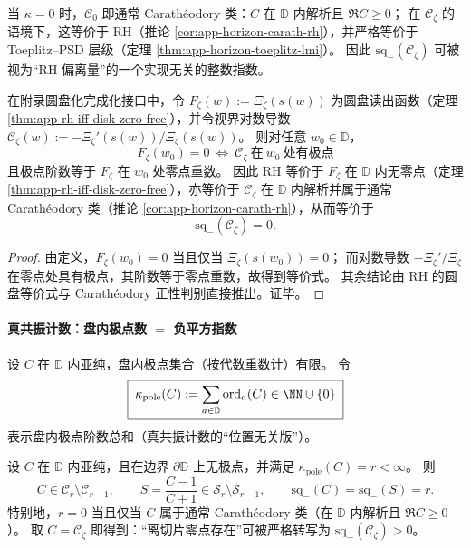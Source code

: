 \begin{remark}\label{rem:xi-negative-squares-vs-psd}
当 \(\kappa=0\) 时，\(\mathcal{C}_0\) 即通常 Carath\'eodory 类：\(C\) 在 \(\mathbb{D}\) 内解析且 \(\Re C\ge 0\)；
在 \(\mathscr{C}_{\zeta}\) 的语境下，这等价于 RH（推论 \ref{cor:app-horizon-carath-rh}），并严格等价于 Toeplitz--PSD 层级（定理 \ref{thm:app-horizon-toeplitz-lmi}）。
因此 \(\mathrm{sq}_-(\mathscr{C}_{\zeta})\) 可被视为“RH 偏离量”的一个实现无关的整数指数。
\end{remark}

\begin{theorem}\label{thm:xi-disk-zero-pole-index-reduction}
在附录圆盘化完成化接口中，令
\(
F_{\zeta}(w):=\Xi_{\zeta}(s(w))
\)
为圆盘读出函数（定理 \ref{thm:app-rh-iff-disk-zero-free}），并令视界对数导数
\(
\mathscr{C}_{\zeta}(w):=-\Xi_{\zeta}'(s(w))/\Xi_{\zeta}(s(w))
\)。
则对任意 \(w_0\in\mathbb{D}\)，
\[
\boxed{\;
F_{\zeta}(w_0)=0\ \Longleftrightarrow\ \mathscr{C}_{\zeta}\ \text{在}\ w_0\ \text{处有极点}\;}
\]
且极点阶数等于 \(F_{\zeta}\) 在 \(w_0\) 处零点重数。
因此 RH 等价于 \(F_{\zeta}\) 在 \(\mathbb{D}\) 内无零点（定理 \ref{thm:app-rh-iff-disk-zero-free}），亦等价于 \(\mathscr{C}_{\zeta}\) 在 \(\mathbb{D}\) 内解析并属于通常 Carath\'eodory 类（推论 \ref{cor:app-horizon-carath-rh}），从而等价于
\[
\boxed{\;\mathrm{sq}_-(\mathscr{C}_{\zeta})=0.\;}
\]
\end{theorem}

\begin{proof}
由定义，\(F_{\zeta}(w_0)=0\) 当且仅当 \(\Xi_{\zeta}(s(w_0))=0\)；
而对数导数 \(-\Xi_{\zeta}'/\Xi_{\zeta}\) 在零点处具有极点，其阶数等于零点重数，故得到等价式。
其余结论由 RH 的圆盘等价式与 Carath\'eodory 正性判别直接推出。证毕。
\end{proof}

\paragraph{真共振计数：盘内极点数 \texorpdfstring{$=$}{=} 负平方指数}
设 \(C\) 在 \(\mathbb{D}\) 内亚纯，盘内极点集合（按代数重数计）有限。
令
\begin{equation}\label{eq:xi-polecount-kappa}
\boxed{\;
\kappa_{\mathrm{pole}}(C):=\sum_{a\in\mathbb{D}}\operatorname{ord}_{a}(C)\in\NN\cup\{0\}\;}
\end{equation}
表示盘内极点阶数总和（真共振计数的“位置无关版”）。

\begin{theorem}\label{thm:xi-poles-negative-squares-equivalence}
设 \(C\) 在 \(\mathbb{D}\) 内亚纯，且在边界 \(\partial\mathbb{D}\) 上无极点，并满足 \(\kappa_{\mathrm{pole}}(C)=r<\infty\)。
则
\[
C\in\mathcal{C}_{r}\setminus\mathcal{C}_{r-1},
\qquad
S=\frac{C-1}{C+1}\in\mathcal{S}_{r}\setminus\mathcal{S}_{r-1},
\qquad
\mathrm{sq}_-(C)=\mathrm{sq}_-(S)=r.
\]
特别地，\(r=0\) 当且仅当 \(C\) 属于通常 Carath\'eodory 类（在 \(\mathbb{D}\) 内解析且 \(\Re C\ge 0\)）。
取 \(C=\mathscr{C}_{\zeta}\) 即得到：“离切片零点存在”可被严格转写为 \(\mathrm{sq}_-(\mathscr{C}_{\zeta})>0\)。
\end{theorem}

